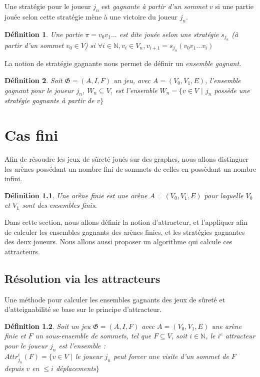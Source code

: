 \documentclass[12pt,a4paper,oneside,titlepage]{report}
\newtheorem{defi}{D\'efinition}[section]
\begin{document}
\noindent Une stratégie pour le joueur $j_n$ est \emph{gagnante à partir d'un sommet} $v$ si une partie jouée selon cette stratégie mène à une victoire du joueur $j_n$.

\begin{defi}
Une partie $\pi=v_0 v_1 ...$ est dite \emph{jouée selon une stratégie} $s_{j_n}$  (à partir d'un sommet $v_0 \in V$) si $\forall i \in \mathbb{N}, v_i \in V_n, v_{i+1} = s_{j_n}(v_0v_1...v_i)$
\end{defi}

\noindent La notion de stratégie gagnante nous permet de définir un \emph{ensemble gagnant}. 
\begin{defi}
\label{finitewinningset}
Soit $\mathfrak{G}=(A,I,F)$ un jeu, avec $A=(V_0, V_1, E)$, l'\emph{ensemble gagnant} pour le joueur $j_n$, $W_n\subseteq V$, est l'ensemble $W_n=\{v\in V$ $|$ $j_n$ possède une stratégie gagnante à partir de $v \}$
\end{defi}


\chapter{Cas fini}
\renewcommand{\leftmark}{CHAPITRE \thechapter.~~Cas fini}
Afin de résoudre les jeux de sûreté joués sur des graphes, nous allons distinguer les arènes possédant un nombre fini de sommets de celles en possèdant un nombre infini. 
\begin{defi}
Une \emph{arène finie} est une arène $A=(V_0, V_1, E)$ pour laquelle $V_0$ et $V_1$ sont des ensembles finis.
\end{defi}
\noindent Dans cette section, nous allons définir la notion d'attracteur, et l'appliquer afin de calculer les ensembles gagnants des arènes finies, et les stratégies gagnantes des deux joueurs. Nous allons aussi proposer un algorithme qui calcule ces attracteurs.
\section{Résolution via les attracteurs}
Une méthode pour calculer les ensembles gagnants des jeux de sûreté et d'atteignabilité se base sur le principe d'attracteur. 
\begin{defi}
	Soit un jeu $\mathfrak{G} = (A,I,F)$ avec $A=(V_0, V_1, E)$ une arène finie et $F$ un sous-ensemble de sommets, tel que $F\subseteq V$, soit $i\in \mathbb{N}$, le $i^e$ attracteur pour le joueur $j_n$ est l'ensemble :\\
	$Attr_{j_n}^i(F)=\{v\in V$ $|$ le joueur $j_n$ peut forcer une visite d'un sommet de $F
$ depuis $v$ en $ \leq  i $ déplacements$\}$
\end{defi}
\end{document}
